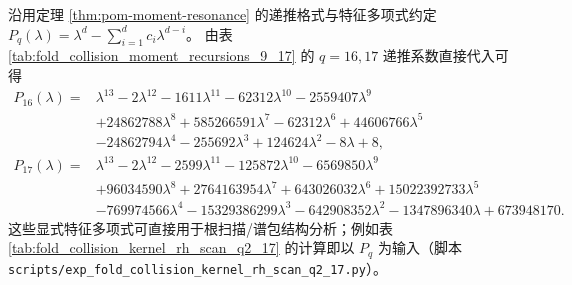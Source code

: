 \begin{remark}\label{rem:pom-moment-charpoly-16-17}
沿用定理 \ref{thm:pom-moment-resonance} 的递推格式与特征多项式约定
\(
P_q(\lambda)=\lambda^d-\sum_{i=1}^d c_i\lambda^{d-i}
\)。
由表 \ref{tab:fold_collision_moment_recursions_9_17} 的 \(q=16,17\) 递推系数直接代入可得
$$
\begin{aligned}
P_{16}(\lambda)={}&\lambda^{13}-2\lambda^{12}-1611\lambda^{11}-62312\lambda^{10}-2559407\lambda^9\\
&+24862788\lambda^8+585266591\lambda^7-62312\lambda^6+44606766\lambda^5\\
&-24862794\lambda^4-255692\lambda^3+124624\lambda^2-8\lambda+8,
\\
P_{17}(\lambda)={}&\lambda^{13}-2\lambda^{12}-2599\lambda^{11}-125872\lambda^{10}-6569850\lambda^9\\
&+96034590\lambda^8+2764163954\lambda^7+643026032\lambda^6+15022392733\lambda^5\\
&-769974566\lambda^4-15329386299\lambda^3-642908352\lambda^2-1347896340\lambda+673948170.
\end{aligned}
$$
这些显式特征多项式可直接用于根扫描/谱包结构分析；例如表 \ref{tab:fold_collision_kernel_rh_scan_q2_17} 的计算即以 \(P_q\) 为输入（脚本 \texttt{scripts/exp\_fold\_collision\_kernel\_rh\_scan\_q2\_17.py}）。
\end{remark}

